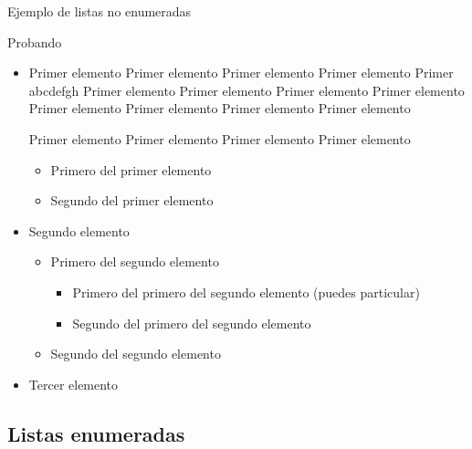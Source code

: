 \documentclass[10pt, envcountsect, presentation, aspectratio=43]{beamer}
\begin{document}
\begin{frame}{Ejemplo de listas no enumeradas}

Probando



\begin{itemize}
\item Primer elemento Primer elemento Primer elemento Primer elemento {Primer abcdefgh} Primer elemento Primer elemento Primer elemento Primer elemento Primer elemento Primer elemento Primer elemento Primer elemento

Primer elemento Primer elemento Primer elemento Primer elemento 
	\begin{itemize}
	\item Primero del primer elemento
	\item Segundo del primer elemento 
	\end{itemize}
\item Segundo elemento
	\begin{itemize}
	\item Primero del segundo elemento
			\begin{itemize}
			\item[--] Primero del primero del segundo elemento (puedes particular)
			\item Segundo del primero del segundo elemento 
			\end{itemize}

	\item Segundo del segundo elemento 
	\end{itemize}
\item Tercer elemento
\end{itemize}
\end{frame}


\subsection{Listas enumeradas}
\end{document}
